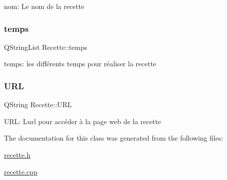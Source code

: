 nom\+: Le nom de la recette \mbox{\label{classRecette_a261ca9e16eee39df297117167cf59d93}} 
\subsubsection{\texorpdfstring{temps}{temps}}
{\footnotesize\ttfamily Q\+String\+List Recette\+::temps\hspace{0.3cm}{\ttfamily [private]}}

temps\+: les différents temps pour réaliser la recette \mbox{\label{classRecette_a7e0fe7b2bce6f2936644636180455649}} 
\subsubsection{\texorpdfstring{U\+RL}{URL}}
{\footnotesize\ttfamily Q\+String Recette\+::\+U\+RL\hspace{0.3cm}{\ttfamily [private]}}

U\+RL\+: L\textquotesingle{}url pour accéder à la page web de la recette 

The documentation for this class was generated from the following files\+:\begin{DoxyCompactItemize}
\item 
\hyperlink{recette_8h}{recette.\+h}\item 
\hyperlink{recette_8cpp}{recette.\+cpp}\end{DoxyCompactItemize}

